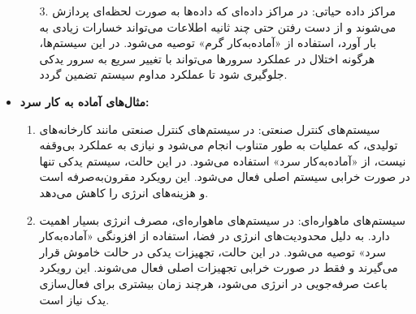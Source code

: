 \begin{qsolve}
	\begin{itemize}
		\item [ ]
		\begin{enumerate}
			\item [3.]
			مراکز داده حیاتی: در مراکز داده‌ای که داده‌ها به صورت لحظه‌ای پردازش می‌شوند و از دست رفتن حتی چند ثانیه اطلاعات می‌تواند خسارات زیادی به بار آورد، استفاده از «آماده‌به‌کار گرم» توصیه می‌شود. در این سیستم‌ها، هرگونه اختلال در عملکرد سرورها می‌تواند با تغییر سریع به سرور یدکی جلوگیری شود تا عملکرد مداوم سیستم تضمین گردد.
		\end{enumerate}
		
		\item 
		\textbf{مثال‌های آماده به کار سرد:}\\
		\begin{enumerate}
			\item 
			سیستم‌های کنترل صنعتی: در سیستم‌های کنترل صنعتی مانند کارخانه‌های تولیدی، که عملیات به طور متناوب انجام می‌شود و نیازی به عملکرد بی‌وقفه نیست، از «آماده‌به‌کار سرد» استفاده می‌شود. در این حالت، سیستم یدکی تنها در صورت خرابی سیستم اصلی فعال می‌شود. این رویکرد مقرون‌به‌صرفه است و هزینه‌های انرژی را کاهش می‌دهد.
			
			\item 
			سیستم‌های ماهواره‌ای: در سیستم‌های ماهواره‌ای، مصرف انرژی بسیار اهمیت دارد. به دلیل محدودیت‌های انرژی در فضا، استفاده از افزونگی «آماده‌به‌کار سرد» توصیه می‌شود. در این حالت، تجهیزات یدکی در حالت خاموش قرار می‌گیرند و فقط در صورت خرابی تجهیزات اصلی فعال می‌شوند. این رویکرد باعث صرفه‌جویی در انرژی می‌شود، هرچند زمان بیشتری برای فعال‌سازی یدک نیاز است.
		\end{enumerate}
	\end{itemize}
\end{qsolve}